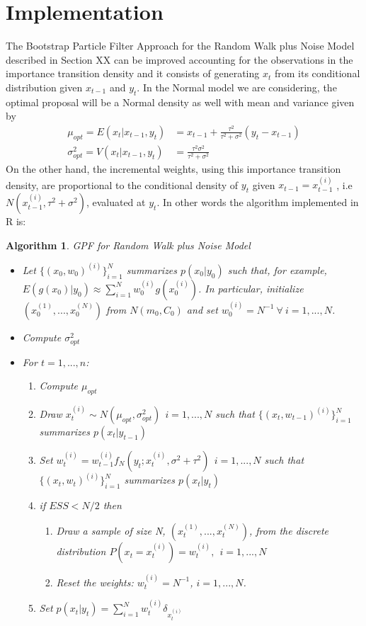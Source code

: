 \documentclass[
]{book}
\theoremstyle{break}
\theoremstyle{nonumberplain}
\newtheorem{algorithm}{Algorithm}[section]
\begin{document}
\section{Implementation}

\hfill\break
The Bootstrap Particle Filter Approach for the Random Walk plus Noise
Model described in Section XX can be improved accounting for the
observations in the importance transition density and it consists of
generating \(x_{t}\) from its conditional distribution given \(x_{t-1}\)
and \(y_{t}\). In the Normal model we are considering, the optimal
proposal will be a Normal density as well with mean and variance given
by \begin{align*}
\mu_{opt}=E(x_{t}|x_{t-1},y_{t})&=x_{t-1}+\frac{\tau^{2}}{\tau^{2}+\sigma^{2}}(y_{t}-x_{t-1})\\
\sigma_{opt}^{2}=V(x_{t}|x_{t-1},y_{t})&=\frac{\tau^{2}\sigma^{2}}{\tau^{2}+\sigma^{2}}
\end{align*} On the other hand, the incremental weights, using this
importance transition density, are proportional to the conditional
density of \(y_{t}\) given \(x_{t-1}=x_{t-1}^{(i)}\) , i.e
\(N(x_{t-1}^{(i)},\tau^{2}+\sigma^{2})\), evaluated at \(y_{t}\). In
other words the algorithm implemented in R is:

\begin{algorithm} GPF for Random Walk plus Noise Model
\begin{itemize}
\item Let $\{(x_{0},w_{0})^{(i)}\}_{i=1}^{N}$ summarizes $p(x_{0}|y_{0})$ such that, for example, $E(g(x_{0})|y_{0}) \approx \sum_{i=1}^{N}w_{0}^{(i)}g(x_{0}^{(i)})$. In particular, initialize $(x_{0}^{(1)},...,x_{0}^{(N)})$ from $N(m_{0},C_{0})$ and set $w_{0}^{(i)}=N^{-1} \ \forall \ i=1,...,N$.
\item Compute $\sigma_{opt}^{2}$ 
\item For $t=1,...,n$:
\begin{enumerate}
\item Compute $\mu_{opt}$
\item Draw $x_{t}^{(i)} \sim N(\mu_{opt},\sigma_{opt}^{2}) \ \ i=1,...,N$ such that $\{(x_{t},w_{t-1})^{(i)}\}_{i=1}^{N}$ summarizes $p(x_{t}|y_{t-1})$
\item Set $w_{t}^{(i)} = w_{t-1}^{(i)}f_{N}(y_{t};x_{t}^{(i)},\sigma^2+\tau^{2}) \ \ i=1,...,N$ such that $\{(x_{t},w_{t})^{(i)}\}_{i=1}^{N}$ summarizes $p(x_{t}|y_{t})$
\item if $ESS<N/2$ then
\begin{enumerate}
\item Draw a sample of size N, $(x_{t}^{(1)},...,x_{t}^{(N)})$, from the discrete distribution $P(x_{t}=x_{t}^{(i)})=w_{t}^{(i)},\ \ i=1,...,N$
\item Reset the weights: $w_{t}^{(i)}=N^{-1}$, $i=1,...,N$.
\end{enumerate}
\item Set $p(x_{t}|y_{t})=\sum_{i=1}^{N}w_{t}^{(i)}\delta_{x_{t}^{(i)}}$
\end{enumerate}
\end{itemize}
\end{algorithm}
\end{document}
